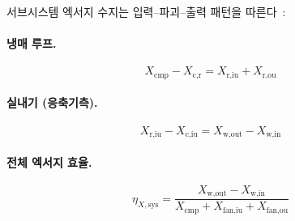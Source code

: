 서브시스템 엑서지 수지는 입력--파괴--출력 패턴을 따른다~\cite{tsatsaronis2007}:

\paragraph{냉매 루프.}
\begin{equation}\label{eq:ashp-Xr}
  X_\text{cmp} - X_\text{c,r} = X_\text{r,iu} + X_\text{r,ou}
\end{equation}

\paragraph{실내기 (응축기측).}
\begin{equation}\label{eq:ashp-Xiu}
  X_\text{r,iu} - X_\text{c,iu} = X_\text{w,out} - X_\text{w,in}
\end{equation}

\paragraph{전체 엑서지 효율.}
\begin{equation}\label{eq:ashp-etaX}
  \eta_{X,\text{sys}} = \frac{X_\text{w,out} - X_\text{w,in}}{X_\text{cmp} + X_\text{fan,iu} + X_\text{fan,ou}}
\end{equation}

